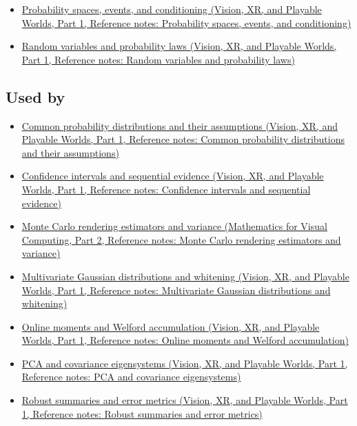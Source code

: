 \begin{itemize}
\tightlist
\item
  \href{../07-Vision-XR-and-Playable-Worlds-P01/main.pdf\#appendix-f1ef323f6ed7}{Probability spaces, events, and conditioning (Vision, XR, and Playable Worlds, Part 1, Reference notes: Probability spaces, events, and conditioning)}
\item
  \href{../07-Vision-XR-and-Playable-Worlds-P01/main.pdf\#appendix-4d0203f7944f}{Random variables and probability laws (Vision, XR, and Playable Worlds, Part 1, Reference notes: Random variables and probability laws)}
\end{itemize}

\subsection{Used by}\label{appendix-54c383df9992-used-by}

\hypertarget{appendix-54c383df9992-used-by}{}

\begin{itemize}
\tightlist
\item
  \href{../07-Vision-XR-and-Playable-Worlds-P01/main.pdf\#appendix-a2360b435383}{Common probability distributions and their assumptions (Vision, XR, and Playable Worlds, Part 1, Reference notes: Common probability distributions and their assumptions)}
\item
  \href{../07-Vision-XR-and-Playable-Worlds-P01/main.pdf\#appendix-c83016554b1e}{Confidence intervals and sequential evidence (Vision, XR, and Playable Worlds, Part 1, Reference notes: Confidence intervals and sequential evidence)}
\item
  \href{../02-Mathematics-for-Visual-Computing-P02/main.pdf\#appendix-031e02bf28af}{Monte Carlo rendering estimators and variance (Mathematics for Visual Computing, Part 2, Reference notes: Monte Carlo rendering estimators and variance)}
\item
  \href{../07-Vision-XR-and-Playable-Worlds-P01/main.pdf\#appendix-12bbe185dbe5}{Multivariate Gaussian distributions and whitening (Vision, XR, and Playable Worlds, Part 1, Reference notes: Multivariate Gaussian distributions and whitening)}
\item
  \href{../07-Vision-XR-and-Playable-Worlds-P01/main.pdf\#appendix-33237f0f618b}{Online moments and Welford accumulation (Vision, XR, and Playable Worlds, Part 1, Reference notes: Online moments and Welford accumulation)}
\item
  \href{../07-Vision-XR-and-Playable-Worlds-P01/main.pdf\#appendix-ad175ef3c5bf}{PCA and covariance eigensystems (Vision, XR, and Playable Worlds, Part 1, Reference notes: PCA and covariance eigensystems)}
\item
  \href{../07-Vision-XR-and-Playable-Worlds-P01/main.pdf\#appendix-bcc44e9d3d02}{Robust summaries and error metrics (Vision, XR, and Playable Worlds, Part 1, Reference notes: Robust summaries and error metrics)}
\end{itemize}

